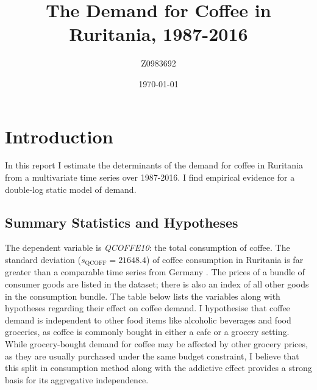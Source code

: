 \documentclass[12pt]{article}
\begin{document}
\doublespacing
\title{The Demand for Coffee in Ruritania, 1987-2016}
\author{Z0983692}
\date{\today}
\maketitle

\section{Introduction} %
\label{sec:introduction}
In this report I estimate the determinants of the demand for coffee in Ruritania from a multivariate time series over 1987-2016. I find empirical evidence for a double-log static model of demand.
\subsection{Summary Statistics and Hypotheses} %
\label{sub:summary_statistics_and_hypotheses}

The dependent variable is \emph{QCOFFE10}: the total consumption of coffee. The standard deviation (\(s_{\textrm{QCOFF}} = 21648.4 \)) of coffee consumption in Ruritania is far greater than a comparable time series from Germany \parencite{deutscherkaffeeverbandCoffeeCapitaConsumption}.  The prices of a bundle of consumer goods are listed in the dataset; there is also an index of all other goods in the consumption bundle. The table below lists the variables along with hypotheses regarding their effect on coffee demand. I hypothesise that coffee demand is independent to other food items like alcoholic beverages and food groceries, as coffee is commonly bought in either a cafe or a grocery setting. While grocery-bought demand for coffee may be affected by other grocery prices, as they are usually purchased under the same budget constraint, I believe that this split in consumption method along with the addictive effect provides a strong basis for its aggregative independence.
\end{document}
